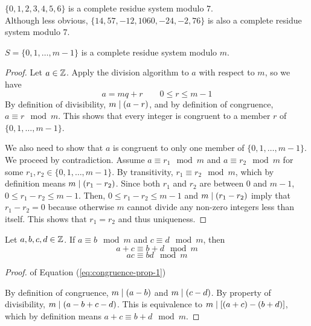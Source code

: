 \begin{example}
    $\{0,1,2,3,4,5,6\}$ is a complete residue system modulo $7$. \\ Although less obvious, $\{14,57,-12,1060,-24,-2,76\}$ is also a complete residue system modulo $7$.
\end{example}

\begin{proposition}
    $S = \{0,1,\ldots,m-1\}$ is a complete residue system modulo $m$.
\end{proposition}

\begin{proof}
    Let $a \in \mathbb{Z}$. Apply the division algorithm to $a$ with respect to $m$, so we have
    $$
    a = mq + r \qquad 0 \leq r \leq m-1
    $$
    By definition of divisibility, $m \mathrel{\mid} (a-r)$, and by definition of congruence, $a \equiv r \mod m$. This shows that every integer is congruent to a member $r$ of $\{0,1,\ldots,m-1\}$.

    We also need to show that $a$ is congruent to only one member of $\{0,1,\ldots,m-1\}$. We proceed by contradiction. Assume $a \equiv r_1 \mod m$ and $a \equiv r_2 \mod m$ for some $r_1,r_2 \in \{0,1,\ldots,m-1\}$. By transitivity, $r_1 \equiv r_2 \mod m$, which by definition means $m \mathrel{\mid} (r_1 - r_2)$. Since both $r_1$ and $r_2$ are between 0 and $m-1$, $0 \leq r_1-r_2 \leq m-1$. Then, $0 \leq r_1 - r_2 \leq m - 1$ and $m \mathrel{\mid} (r_1-r_2)$ imply that $r_1-r_2 = 0$ because otherwise $m$ cannot divide any non-zero integers less than itself. This shows that $r_1 = r_2$ and thus uniqueness.
\end{proof}

\begin{proposition}
    Let $a,b,c,d \in \mathbb{Z}$. If $a \equiv b \mod m$ and $c \equiv d \mod m$, then
    \begin{equation} \label{eq:congruence-prop-1}
        a + c \equiv b + d \mod m
    \end{equation}
    \begin{equation} \label{eq:congruence-prop-2}
        ac \equiv bd \mod m
    \end{equation}
\end{proposition}

\begin{proof} of Equation (\ref{eq:congruence-prop-1})

    By definition of congruence, $m \mathrel{\mid} (a-b)$ and $m \mathrel{\mid} (c-d)$. By property of divisibility, $m \mathrel{\mid} (a-b+c-d)$. This is equivalence to $m \mathrel{\mid} [(a+c)-(b+d)]$, which by definition means $a+c \equiv b+d \mod m$.
\end{proof}

